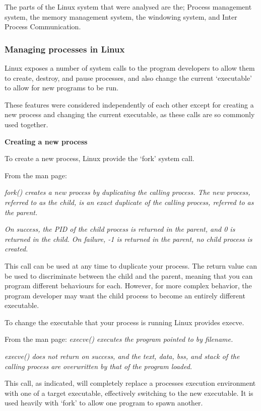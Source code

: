 \documentclass[a4paper]{report}
\begin{document}
The parts of the Linux system that were analysed are the; Process management system, the memory management system, the windowing system, and Inter Process Communication.

\subsubsection*{Managing processes in Linux}

Linux exposes a number of system calls to the program developers to allow them to create, destroy, and pause processes, and also change the current `executable' to allow for new programs to be run.

These features were considered independently of each other except for creating a new process and changing the current executable, as these calls are so commonly used together. 


\textbf{Creating a new process}

To create a new process, Linux provide the `fork' system call. 

From the man page: 

\textit {fork() creates a new process by duplicating the calling process.  The new process, referred to as the child, is an exact duplicate  of  the calling  process, referred to as the parent.} 

\textit {On  success,  the PID of the child process is returned in the parent, and 0 is returned in the child.  On failure, -1 is  returned  in  the parent, no child process is created.} \cite{manFork}

This call can be used at any time to duplicate your process. The return value can be used to discriminate between the child and the parent, meaning that you can program different behaviours for each. However, for more complex behavior, the program developer may want the child process to become an entirely different executable.

To change the executable that your process is running Linux provides execve.

From the man page:
\textit {execve()  executes the program pointed to by filename.}

\textit {execve() does not return on success, and the  text,  data,  bss,  and stack  of  the calling process are overwritten by that of the program loaded.} \cite{manExecve}

This call, as indicated, will completely replace a processes execution environment with one of a target executable, effectively switching to the new executable. It is used heavily with `fork' to allow one program to spawn another.
\end{document}

